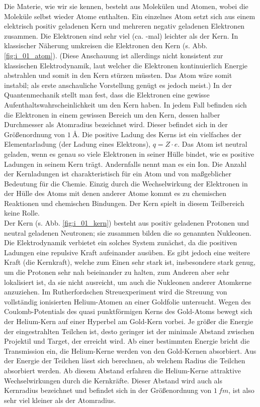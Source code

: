 Die Materie, wie wir sie kennen, besteht aus Molekülen und Atomen, wobei die Moleküle selbst wieder Atome enthalten. Ein einzelnes Atom setzt sich aus einem elektrisch positiv geladenen Kern und mehreren negativ geladenen Elektronen zusammen. Die Elektronen sind sehr viel (ca. -mal) leichter als der Kern. In klassischer Näherung umkreisen die Elektronen den Kern (s. Abb. \ref{fig:i_01_atom}). (Diese Anschauung ist allerdings nicht konsistent zur klassischen Elektrodynamik, laut welcher die Elektronen kontinuierlich Energie abstrahlen und somit in den Kern stürzen müssten. Das Atom wäre somit instabil; als erste anschauliche Vorstellung genügt es jedoch meist.) In der Quantenmechanik stellt man fest, dass die Elektronen eine gewisse Aufenthaltswahrscheinlichkeit um den Kern haben. In jedem Fall befinden sich die Elektronen in einem gewissen Bereich um den Kern, dessen halber Durchmesser als Atomradius bezeichnet wird. Dieser befindet sich in der Größenordnung von $\SI{1}{\angstrom}$. Die positive Ladung des Kerns ist ein vielfaches der Elementarladung (der Ladung eines Elektrons), $q = Z \cdot e$. Das Atom ist neutral geladen, wenn es genau so viele Elektronen in seiner Hülle bindet, wie es positive Ladungen in seinem Kern trägt. Andernfalls nennt man es ein Ion. Die Anzahl der Kernladungen ist charakteristisch für ein Atom und von maßgeblicher Bedeutung für die Chemie. Einzig durch die Wechselwirkung der Elektronen in der Hülle des Atoms mit denen anderer Atome kommt es zu chemischen Reaktionen und chemischen Bindungen. Der Kern spielt in diesem Teilbereich keine Rolle.\\
Der Kern (s. Abb. \ref{fig:i_01_kern}) besteht aus positiv geladenen Protonen und neutral geladenen Neutronen; sie zusammen bilden die so genannten Nukleonen. Die Elektrodynamik verbietet ein solches System zunächst, da die positiven Ladungen eine repulsive Kraft aufeinander ausüben. Es gibt jedoch eine weitere Kraft (die Kernkraft), welche zum Einen sehr stark ist, insbesondere stark genug, um die Protonen sehr nah beieinander zu halten, zum Anderen aber sehr lokalisiert ist, da sie nicht ausreicht, um auch die Nukleonen anderer Atomkerne anzuziehen. Im Rutherfordschen Streuexperiment wird die Streuung von vollständig ionisierten Helium-Atomen an einer Goldfolie untersucht. Wegen des Coulomb-Potentials des quasi punktförmigen Kerns des Gold-Atoms bewegt sich der Helium-Kern auf einer Hyperbel am Gold-Kern vorbei. Je größer die Energie der eingestrahlten Teilchen ist, desto geringer ist der minimale Abstand zwischen Projektil und Target, der erreicht wird. Ab einer bestimmten Energie bricht die Transmission ein, die Helium-Kerne werden von den Gold-Kernen absorbiert. Aus der Energie der Teilchen lässt sich berechnen, ab welchem Radius die Teilchen absorbiert werden. Ab diesem Abstand erfahren die Helium-Kerne attraktive Wechselwirkungen durch die Kernkräfte. Dieser Abstand wird auch als Kernradius bezeichnet und befindet sich in der Größenordnung von $\SI{1}{fm}$, ist also sehr viel kleiner als der Atomradius. \cite{HW03}\\
